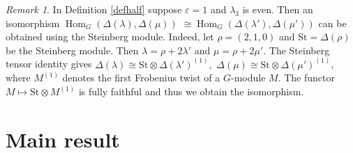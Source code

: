 \documentclass[11pt]{amsart}
\theoremstyle{remark}
\newtheorem{remark}[theorem]{Remark}
\theoremstyle{definition}
\newcommand{\Hom}{\operatorname{Hom}}
\newcommand{\D}{\Delta}
\newcommand{\la}{\lambda}
\numberwithin{equation}{section}
\begin{document}
\begin{remark}\label{steinberghalving}In Definition \ref{defhalf} suppose
	 $\varepsilon=1$ and $\la_3$ is even. Then an
isomorphism
$
\Hom_G(\D(\la),\D(\mu))$ $
\cong
\Hom_G(\D(\la'),\D(\mu'))
$ can be obtained using the Steinberg module.
Indeed, let $\rho=(2,1,0)$ and
$\mathrm{St}=\Delta(\rho)$ be the Steinberg module.
Then $\la=\rho+2\la'$ and $\mu=\rho+2\mu'$.
The Steinberg tensor identity
\cite[II.3.18, 3.19]{Ja} gives
$
\D(\la)\cong
\mathrm{St}\otimes\D(\la')^{(1)},$
 $
\D(\mu)\cong
\mathrm{St}\otimes\D(\mu')^{(1)}
$, where $M^{(1)}$ denotes the first Frobenius twist of a $G$-module $M$. The functor
$M\mapsto\mathrm{St}\otimes M^{(1)}$
is fully faithful \cite[II.10.5(1)]{Ja} and thus
we obtain the isomorphism.
\end{remark}

\section{Main result}\label{sec4}
\end{document}
